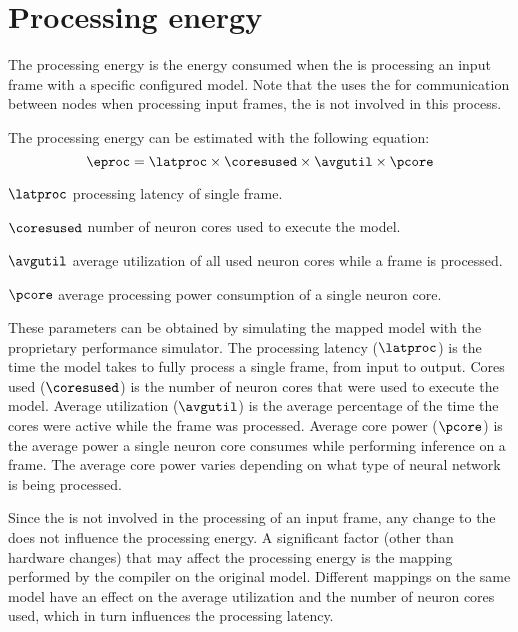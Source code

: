 \section{Processing energy}
The processing energy is the energy consumed when the \graicore{} is processing an input frame with a specific configured model.
Note that the \graicore{} uses the \eventnoc{} for communication between nodes when processing input frames, the \confignoc{} is not involved in this process.

The processing energy can be estimated with the following equation:
\begin{equation}
    \eproc = \latproc \times \coresused \times \avgutil \times \pcore
\end{equation}
\eqexplSetItemWidth{6em}
\begin{eqexpl}
    \item{$\latproc$} processing latency of single frame.
    \item{$\coresused$} number of neuron cores used to execute the model.
    \item{$\avgutil$} average utilization of all used neuron cores while a frame is processed.
    \item{$\pcore$} average processing power consumption of a single neuron core.
\end{eqexpl}

These parameters can be obtained by simulating the mapped model with the proprietary performance simulator.
The processing latency ($\latproc$) is the time the model takes to fully process a single frame, from input to output.
Cores used ($\coresused$) is the number of neuron cores that were used to execute the model.
Average utilization ($\avgutil$) is the average percentage of the time the cores were active while the frame was processed. 
Average core power ($\pcore$) is the average power a single neuron core consumes while performing inference on a frame.
The average core power varies depending on what type of neural network is being processed.

Since the \confignoc{} is not involved in the processing of an input frame, any change to the \confignoc{} does not influence the processing energy.
A significant factor (other than hardware changes) that may affect the processing energy is the mapping performed by the compiler on the original model. 
Different mappings on the same model have an effect on the average utilization and the number of neuron cores used, which in turn influences the processing latency.

